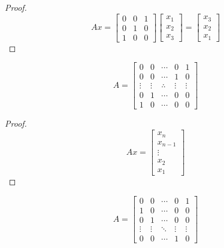 \begin{proof}
    \begin{equation} A x=\left[\begin{array}{lll}0 & 0 & 1 \\ 0 & 1 & 0 \\ 1 & 0 & 0\end{array}\right]\left[\begin{array}{l}x_{1} \\ x_{2} \\ x_{3}\end{array}\right]=\left[\begin{array}{l}x_{3} \\ x_{2} \\ x_{1}\end{array}\right] \end{equation}
\end{proof}

\begin{definition}
    \begin{equation} A=\left[\begin{array}{ccccc}0 & 0 & \cdots & 0 & 1 \\ 0 & 0 & \cdots & 1 & 0 \\ \vdots & \vdots & \therefore & \vdots & \vdots \\ 0 & 1 & \cdots & 0 & 0 \\ 1 & 0 & \cdots & 0 & 0\end{array}\right] \end{equation}
\end{definition}

\begin{proof}
    \begin{equation} A x=\left[\begin{array}{c}x_{n} \\ x_{n-1} \\ \vdots \\ x_{2} \\ x_{1}\end{array}\right] \end{equation}
\end{proof}

\begin{definition}
    \begin{equation} A=\left[\begin{array}{ccccc}0 & 0 & \cdots & 0 & 1 \\ 1 & 0 & \cdots & 0 & 0 \\ 0 & 1 & \cdots & 0 & 0 \\ \vdots & \vdots & \ddots & \vdots & \vdots \\ 0 & 0 & \cdots & 1 & 0\end{array}\right] \end{equation}
\end{definition}

